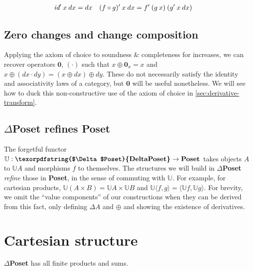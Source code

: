 \documentclass{rntz}\usepackage[a5]{rntzgeometry}\usepackage[fullwidth=13cm,width=315pt]{narrow}
\newcommand\mathvar[1]{\ensuremath{#1}} %
\newcommand\<{\mskip 4mu plus 4mu minus 1mu}
\newcommand\dx{\mathvar{dx}}
\newcommand\dy{\mathvar{dy}}
\newcommand\cat\textbf
\newcommand\CP{\cat{\texorpdfstring{$\Delta$Poset}{DeltaPoset}}}
\newcommand\Poset{\cat{Poset}}
\newcommand\D\Delta
\newcommand\x\times
\newcommand\zero{\ensuremath{\mathbold{0}}}
\newcommand\fname[1]{\textit{#1}}
\newcommand\id{\fname{id}}
\newcommand\valfn{\ensuremath{\mathbb{U}}}
\newcommand\vals{\valfn}
\newcommand\chgs[1]{\D{#1}}
\newcommand\deriv[1]{\ensuremath{#1'}}
\newcommand\upd{\mathbin{\oplus}}
\newcommand\fork[1]{\langle{#1}\rangle}
\begin{document}
\begin{align*}
  \deriv\id \<x\<\dx &= \dx
  & \deriv{(f \circ g)} \<x\<\dx &= \deriv f \<(g\<x) \<(\deriv g\<x\<\dx)
\end{align*}


\subsection{Zero changes and change composition}

Applying the axiom of choice to soundness \& completeness for increases, we can
recover operators $\zero$, $(\cdot)$ such that $x \upd \zero_x = x$ and $x \upd
(\dx \cdot \dy) = (x \upd \dx) \upd \dy$. These do not necessarily satisfy the
identity and associativity laws of a category, but $\zero$ will be useful
nonetheless. We will see how to duck this non-constructive use of the axiom of
choice in \cref{sec:derivative-transform}.


\subsection{\CP{} refines \Poset{}}
\label{sec:refines}

The forgetful functor $\valfn : \CP \to \Poset$ takes objects $A$ to $\vals{A}$
and morphisms $f$ to themselves. The structures we will build in \CP{}
\emph{refine} those in \Poset{}, in the sense of commuting with $\valfn$. For
example, for cartesian products, $\vals{(A \x B)} = \vals{A} \x \vals{B}$ and
$\vals{\fork{f,g}} = \fork{\vals f, \vals g}$.
%
For brevity, we omit the ``value components'' of our constructions when they can
be derived from this fact, only defining $\chgs{A}$ and $\oplus$ and showing the
existence of derivatives.


\section{Cartesian structure}

\begin{theorem}
  \CP{} has all finite products and sums.
\end{theorem}
\end{document}
